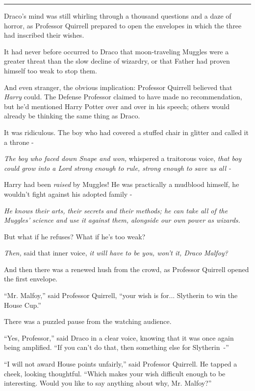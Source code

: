 \begin{center}\rule{3in}{0.4pt}\end{center}

Draco's mind was still whirling through a thousand questions and a daze of horror, as Professor Quirrell prepared to open the envelopes in which the three had inscribed their wishes.

It had never before occurred to Draco that moon-traveling Muggles were a greater threat than the slow decline of wizardry, or that Father had proven himself too weak to stop them.

And even stranger, the obvious implication: Professor Quirrell believed that \emph{Harry} could. The Defense Professor claimed to have made no recommendation, but he'd mentioned Harry Potter over and over in his speech; others would already be thinking the same thing as Draco.

It was ridiculous. The boy who had covered a stuffed chair in glitter and called it a throne -

\emph{The boy who faced down Snape and won,} whispered a traitorous voice, \emph{that boy could grow into a Lord strong enough to rule, strong enough to save us all -}

Harry had been \emph{raised} by Muggles! He was practically a mudblood himself, he wouldn't fight against his adopted family -

\emph{He knows their arts, their secrets and their methods; he can take all of the Muggles' science and use it against them, alongside our own power as wizards.}

But what if he refuses? What if he's too weak?

\emph{Then,} said that inner voice, \emph{it will have to be you, won't it, Draco Malfoy?}

And then there was a renewed hush from the crowd, as Professor Quirrell opened the first envelope.

``Mr. Malfoy,'' said Professor Quirrell, ``your wish is for... Slytherin to win the House Cup.''

There was a puzzled pause from the watching audience.

``Yes, Professor,'' said Draco in a clear voice, knowing that it was once again being amplified. ``If you can't do that, then something else for Slytherin~-''

``I will not award House points unfairly,'' said Professor Quirrell. He tapped a cheek, looking thoughtful. ``Which makes your wish difficult enough to be interesting. Would you like to say anything about why, Mr. Malfoy?''


